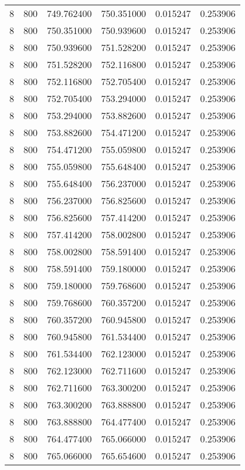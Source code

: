 \begin{longtable}{rrrrrr}
8 & 800 & 749.762400 & 750.351000 & 0.015247 & 0.253906 \\
8 & 800 & 750.351000 & 750.939600 & 0.015247 & 0.253906 \\
8 & 800 & 750.939600 & 751.528200 & 0.015247 & 0.253906 \\
8 & 800 & 751.528200 & 752.116800 & 0.015247 & 0.253906 \\
8 & 800 & 752.116800 & 752.705400 & 0.015247 & 0.253906 \\
8 & 800 & 752.705400 & 753.294000 & 0.015247 & 0.253906 \\
8 & 800 & 753.294000 & 753.882600 & 0.015247 & 0.253906 \\
8 & 800 & 753.882600 & 754.471200 & 0.015247 & 0.253906 \\
8 & 800 & 754.471200 & 755.059800 & 0.015247 & 0.253906 \\
8 & 800 & 755.059800 & 755.648400 & 0.015247 & 0.253906 \\
8 & 800 & 755.648400 & 756.237000 & 0.015247 & 0.253906 \\
8 & 800 & 756.237000 & 756.825600 & 0.015247 & 0.253906 \\
8 & 800 & 756.825600 & 757.414200 & 0.015247 & 0.253906 \\
8 & 800 & 757.414200 & 758.002800 & 0.015247 & 0.253906 \\
8 & 800 & 758.002800 & 758.591400 & 0.015247 & 0.253906 \\
8 & 800 & 758.591400 & 759.180000 & 0.015247 & 0.253906 \\
8 & 800 & 759.180000 & 759.768600 & 0.015247 & 0.253906 \\
8 & 800 & 759.768600 & 760.357200 & 0.015247 & 0.253906 \\
8 & 800 & 760.357200 & 760.945800 & 0.015247 & 0.253906 \\
8 & 800 & 760.945800 & 761.534400 & 0.015247 & 0.253906 \\
8 & 800 & 761.534400 & 762.123000 & 0.015247 & 0.253906 \\
8 & 800 & 762.123000 & 762.711600 & 0.015247 & 0.253906 \\
8 & 800 & 762.711600 & 763.300200 & 0.015247 & 0.253906 \\
8 & 800 & 763.300200 & 763.888800 & 0.015247 & 0.253906 \\
8 & 800 & 763.888800 & 764.477400 & 0.015247 & 0.253906 \\
8 & 800 & 764.477400 & 765.066000 & 0.015247 & 0.253906 \\
8 & 800 & 765.066000 & 765.654600 & 0.015247 & 0.253906 \\

\end{longtable}
